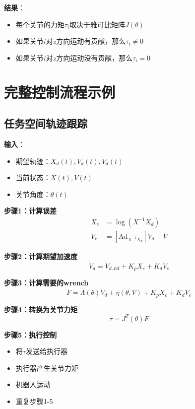 \documentclass[12pt,a4paper]{article}
\begin{document}
\textbf{结果}：
\begin{itemize}
\item 每个关节的力矩$\tau_i$取决于雅可比矩阵$J(\theta)$
\item 如果关节$i$对$z$方向运动有贡献，那么$\tau_i \neq 0$
\item 如果关节$i$对$z$方向运动没有贡献，那么$\tau_i = 0$
\end{itemize}

\section{完整控制流程示例}

\subsection{任务空间轨迹跟踪}

\textbf{输入}：
\begin{itemize}
\item 期望轨迹：$X_d(t), V_d(t), \dot{V}_d(t)$
\item 当前状态：$X(t), V(t)$
\item 关节角度：$\theta(t)$
\end{itemize}

\textbf{步骤1：计算误差}
\begin{align}
X_e &= \log(X^{-1} X_d) \\
V_e &= [\text{Ad}_{X^{-1}X_d}]V_d - V
\end{align}

\textbf{步骤2：计算期望加速度}
\begin{equation}
\dot{V}_d = \dot{V}_{d,\text{ref}} + K_p X_e + K_d V_e
\end{equation}

\textbf{步骤3：计算需要的wrench}
\begin{equation}
F = \Lambda(\theta)\dot{V}_d + \eta(\theta, V) + K_p X_e + K_d V_e
\end{equation}

\textbf{步骤4：转换为关节力矩}
\begin{equation}
\tau = J^T(\theta)F
\end{equation}

\textbf{步骤5：执行控制}
\begin{itemize}
\item 将$\tau$发送给执行器
\item 执行器产生关节力矩
\item 机器人运动
\item 重复步骤1-5
\end{itemize}
\end{document}
